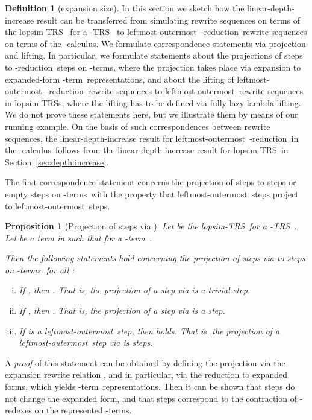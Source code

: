 \documentclass[
submission
]{dmtcs-episciences-tampered}
\newcommand{\nb}{\nobreakdash}
\newcommand{\TRS}{TRS}
\newcommand{\lopsimTRS}{lopsim-TRS}
\newcommand{\lambdacalculus}{\nb-cal\-cu\-lus}
\newcommand{\lambdaterm}{\nb-term}
\newcommand{\lambdaterms}{\lambdaterm{s}}
\newcommand{\lambdalifting}{lambda-lif\-ting}
\newcommand{\betareduction}{\nb-re\-duc\-tion}
\newcommand{\betaredex}{\nb-re\-dex}
\newcommand{\lo}{left\-most-outer\-most}
\newcommand{\lTRS}{\hspace*{-0.5pt}\nb-\hspace*{-0.5pt}\TRS}
\theoremstyle{plain}
\newtheorem{proposition}[theorem]{Proposition}
\theoremstyle{definition}
\newtheorem{definition}[theorem]{Definition}
\begin{document}
\begin{definition}[expansion size]
{In this section we sketch how the linear-depth-increase result can be transferred from simulating rewrite sequences on terms of the \lopsimTRS~
for a \lTRS~ to \lo\ \betareduction\ rewrite sequences on terms of the \lambdacalculus. 
We formulate correspondence statements via projection and lifting. In particular, we formulate statements about the projections of  steps to \betareduction\ steps on \lambdaterms,
where the projection takes place via expansion to expanded-form \lambdaterm\ representations,
and about the lifting of \lo\ \betareduction\ rewrite sequences to \lo\ rewrite sequences in \lopsimTRS{s},
where the lifting has to be defined via fully-lazy \lambdalifting. 
We do not prove these statements here, but we illustrate them by means of our running example. 
On the basis of such correspondences between rewrite sequences, the linear-depth-increase result for \lo\ \betareduction\ in the \lambdacalculus\
follows from the linear-depth-increase result for \lopsimTRS\ in Section~\ref{sec:depth:increase}. 



The first correspondence statement concerns the projection of  steps to  steps or empty steps on \lambdaterms\
with the property that \lo\  steps project to \lo\  steps. 


\begin{proposition}[Projection of  steps via ]
    \label{prop:projection}
  Let  be the \lopsimTRS\ for 
  a \lTRS~.
  Let 
  be a term in  such that  for a \lambdaterm~.
  
  Then the following statements hold concerning the projection of  steps via  
  to steps on \lambdaterms, for all :
  \begin{enumerate}[(i)]\setlength{\itemsep}{0ex} 
    \item
      If , then .
      That is, the projection of a  step via  is a trivial step.
    \item  
      If , then .
      That is, the projection of a  step via  is a  step.
    \item  
      If  is a \lo\ step, then  holds.
      That is, the projection of a \lo\  step via  is  steps.
  \end{enumerate}
\end{proposition}

A \emph{proof} of this statement can be obtained by defining the projection via the expansion rewrite relation ,
and in particular, via the reduction  to expanded forms, which yields \lambdaterm\ representations.
Then it can be shown that  steps do not change the expanded form, and that  steps
correspond to the contraction of \betaredex{es} on the represented \lambdaterms. 

}
\end{definition}
\end{document}
